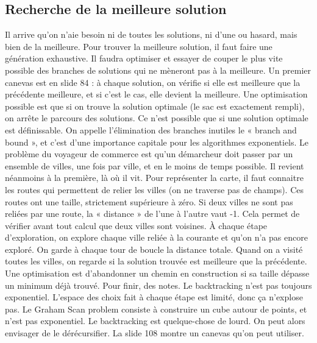 \documentclass[10pt]{article}
\begin{document}
\subsection{Recherche de la meilleure solution}
Il arrive qu'on n'aie besoin ni de toutes les solutions, ni d'une ou hasard, mais bien de la meilleure. Pour trouver la meilleure solution, il faut faire une génération exhaustive. Il faudra optimiser et essayer de couper le plus vite possible des branches de solutions qui ne mèneront pas à la meilleure. 
\newline \newline 
Un premier canevas est en slide 84 : à chaque solution, on vérifie si elle est meilleure que la précédente meilleure, et si c'est le cas, elle devient la meilleure. 
\newline \newline 
Une optimisation possible est que si on trouve la solution optimale (le sac est exactement rempli), on arrête le parcours des solutions. Ce n'est possible que si une solution optimale est définissable. On appelle l'élimination des branches inutiles le « branch and bound », et c'est d'une importance capitale pour les algorithmes exponentiels. 
\newline \newline 
Le problème du voyageur de commerce est qu'un démarcheur doit passer par un ensemble de villes, une fois par ville, et en le moins de temps possible. Il revient néanmoins à la première, là où il vit. 
\newline \newline 
Pour représenter la carte, il faut connaitre les routes qui permettent de relier les villes (on ne traverse pas de champs). Ces routes ont une taille, strictement supérieure à zéro. Si deux villes ne sont pas reliées par une route, la « distance » de l'une à l'autre vaut -1. Cela permet de vérifier avant tout calcul que deux villes sont voisines.  
\newline \newline 
À chaque étape d'exploration, on explore chaque ville reliée à la courante et qu'on n'a pas encore exploré. On garde à chaque tour de boucle la distance totale. Quand on a visité toutes les villes, on regarde si la solution trouvée est meilleure que la précédente. Une optimisation est d'abandonner un chemin en construction si sa taille dépasse un minimum déjà trouvé. 
\newline \newline 
Pour finir, des notes. Le backtracking n'est pas toujours exponentiel. L'espace des choix fait à chaque étape est limité, donc ça n'explose pas. Le Graham Scan problem consiste à construire un cube autour de points, et n'est pas exponentiel. 
\newline \newline 
Le backtracking est quelque-chose de lourd. On peut alors envisager de le dérécursifier. La slide 108 montre un canevas qu'on peut utiliser.
\newpage
\end{document}
